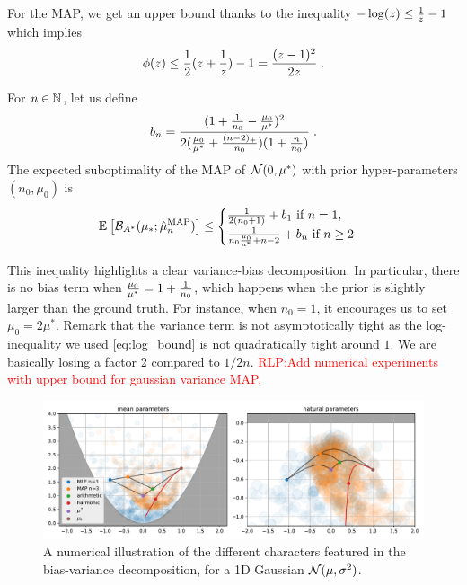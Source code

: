 \documentclass[twoside]{article}
\newcommand{\RLP}[1]{\textcolor{red}{RLP:#1}}
\newcommand*{\expect}[2][]{\ensuremath{\mathbb{E}_{#1} \left[ #2 \right] }} %
\newcommand{\logpart}{A}
\newcommand{\bregmanconj}{\cB_{\logpart^*}}
\begin{document}
For the MAP, we get an upper bound thanks to the inequality $ - \log(z) \leq \frac{1}{z} - 1$ which implies
\begin{align}
	\label{eq:log_bound} 
	\phi(z) \leq \frac{1}{2} (z + \frac{1}{z}) - 1 = \frac{(z-1)^2}{2 z} \; .
\end{align}

\begin{theorem}
 For $n\in \mathbb{N}$, let us  define
 \begin{align}
	b_n = \frac{(1 + \frac{1}{n_0} - \frac{\mu_0}{\mu^*})^2}{2 (\frac{\mu_0}{\mu^*}+\frac{(n-2)_+}{n_0})(1 + \frac{n}{n_0} )} \; .
 \end{align}
The expected suboptimality of the MAP of ${\mathcal N}(0,\mu^*)$ with prior hyper-parameters $(n_0,\mu_0)$ is
 \begin{equation}
	\expect{\bregmanconj( \mu_*; \hat \mu_n^\text{MAP})}
	\leq \begin{cases}
		\inv{2(n_0+1)}  +  b_1 \ \text{if}\ n=1,\\
		\frac{1}{n_0 \frac{\mu_0}{\mu^*} +n-2} + b_n \ \text{if}\ n\geq 2
	\end{cases}
	\label{eq:MAP_rate}
\end{equation}
\end{theorem}

This inequality highlights a clear variance-bias decomposition.
In particular, there is no bias term when $\frac{\mu_0}{\mu^*} =1 + \frac{1}{n_0} $, which happens when the prior is slightly larger than the ground truth.  For instance, when $n_0=1$, it encourages us to set $\mu_0 = 2 \mu^*$.
Remark that the variance term is not asymptotically tight as the log-inequality we used \eqref{eq:log_bound} is not quadratically tight around $1$. We are basically losing a factor 2 compared to $1/2n$.
\RLP{Add numerical experiments with upper bound for gaussian variance MAP.}


\begin{figure}[t]
	\centering
	\includegraphics[width=\textwidth]{figs/thales/numerical_schema_n=3.pdf}
	\caption{A numerical illustration of the different characters featured in the bias-variance decomposition, for a 1D Gaussian ${\mathcal N}(\mu, \sigma^2)$.}
	\label{fig:bias-variance-numerical}
\end{figure}
\end{document}
